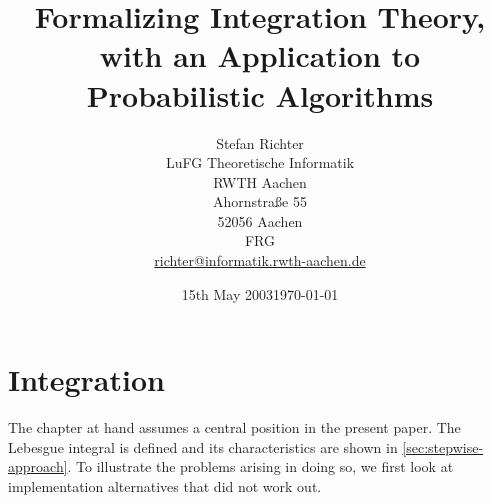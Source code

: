 \documentclass[11pt,a4paper]{report}
\date{15th May 2003}
\begin{document}
\title{Formalizing Integration Theory, with an Application to
  Probabilistic Algorithms}


\author{Stefan Richter\\
  LuFG Theoretische Informatik\\
  RWTH Aachen\\
  Ahornstraße 55\\
  52056 Aachen\\
  FRG\\
  \url{richter@informatik.rwth-aachen.de}}

\date{\today}
      
\maketitle

\pagestyle{headings}
\tableofcontents

% 
\newpage
\pagestyle{headings}

  


\newpage

\chapter{Integration}
\label{cha:integration}

The chapter at hand assumes a central position in the present paper. The Lebesgue
integral is defined and its characteristics are shown in
\ref{sec:stepwise-approach}. To illustrate the problems arising in
doing so, we first look at implementation alternatives that did not
work out. 



 
\begin{flushleft}


\end{flushleft}
\end{document}
